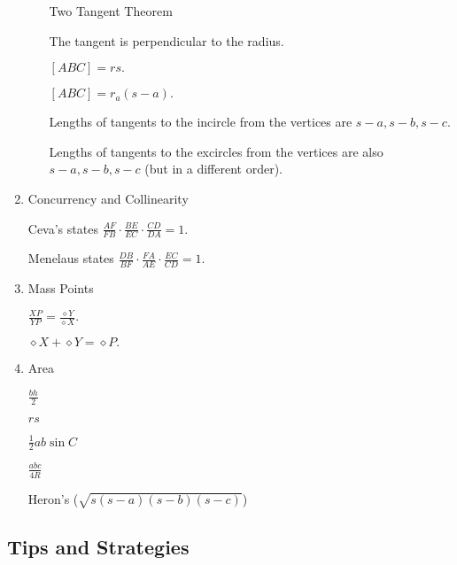 \begin{enumerate}
\begin{itemize}
    \Item Two Tangent Theorem
    
    \Item The tangent is perpendicular to the radius.
    
    \Item $[ABC]=rs.$
    
    \Item $[ABC]=r_a(s-a).$

    \Item Lengths of tangents to the incircle from the vertices are $s-a,s-b,s-c.$
    
    \Item Lengths of tangents to the excircles from the vertices are also $s-a,s-b,s-c$ (but in a different order).
    
    \end{itemize}
    
    \item Concurrency and Collinearity
    
    \begin{itemize}
    
        \Item Ceva's states $\frac{AF}{FB}\cdot\frac{BE}{EC}\cdot\frac{CD}{DA}=1.$
    
        \Item Menelaus states $\frac{DB}{BF}\cdot\frac{FA}{AE}\cdot\frac{EC}{CD}=1.$

    \end{itemize}

    \item Mass Points
    
    \begin{itemize}
        \Item $\frac{XP}{YP}=\frac{\diamond Y}{\diamond X}.$
    
    \Item $\diamond X+\diamond Y=\diamond P.$
    \end{itemize}
    
    \item Area
    
    \begin{itemize}
        \Item $\frac{bh}{2}$
    
    \Item $rs$
    
    \Item $\frac{1}{2}ab\sin C$
    
    \Item $\frac{abc}{4R}$
    
    \Item Heron's ($\sqrt{s(s-a)(s-b)(s-c)}$)
    \end{itemize}

\end{enumerate}

\subsection{Tips and Strategies}

